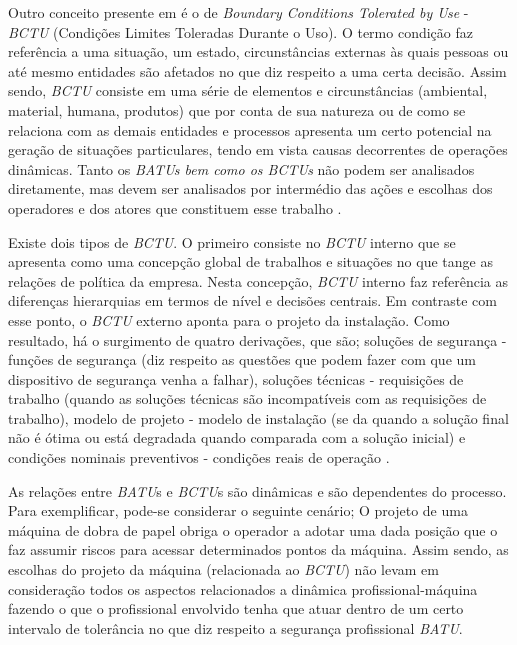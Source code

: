 Outro conceito presente em \cite{safety} é o de \textit{Boundary Conditions Tolerated by Use} - \textit{BCTU} (Condições Limites Toleradas Durante o Uso). O termo condição faz referência a uma situação, um estado, circunstâncias externas às quais pessoas ou até mesmo entidades são afetados no que diz respeito a uma certa decisão. Assim sendo, \textit{BCTU} consiste em uma série de elementos e circunstâncias (ambiental, material, humana, produtos) que por conta de sua natureza ou de como se relaciona com as demais entidades e processos apresenta um certo potencial na geração de situações particulares, tendo em vista causas decorrentes de operações dinâmicas. Tanto os \textit{BATUs bem como os BCTUs} não podem ser analisados diretamente, mas devem ser analisados por intermédio das ações e escolhas dos operadores e dos atores que constituem esse trabalho \cite{safety}. 

Existe dois tipos de \textit{BCTU}. O primeiro consiste no \textit{BCTU} interno que se apresenta como uma concepção global de trabalhos e situações no que tange as relações de política da empresa. Nesta concepção, \textit{BCTU} interno faz referência as diferenças hierarquias em termos de nível e decisões centrais. Em contraste com esse ponto, o \textit{BCTU} externo aponta para o projeto da instalação. Como resultado, há o surgimento de quatro derivações, que são; soluções de segurança - funções de segurança (diz respeito as questões que podem fazer com que um dispositivo de segurança venha a falhar), soluções técnicas - requisições de trabalho (quando as soluções técnicas são incompatíveis com as requisições de trabalho), modelo de projeto - modelo de instalação (se da quando a solução final não é ótima ou está degradada quando comparada com a solução inicial) e condições nominais preventivos - condições reais de operação
\cite{safety}.

As relações entre \textit{BATU}s e \textit{BCTU}s são dinâmicas e são dependentes do processo. Para exemplificar, pode-se considerar o seguinte cenário; O projeto de uma máquina de dobra de papel obriga o operador a adotar uma dada posição que o faz assumir riscos para acessar determinados pontos da máquina.  Assim sendo, as escolhas do projeto da máquina (relacionada ao \textit{BCTU}) não levam em consideração todos os aspectos relacionados a dinâmica profissional-máquina fazendo o que o profissional envolvido tenha que atuar dentro de um certo intervalo de tolerância no que diz respeito a segurança profissional \textit{BATU}.
